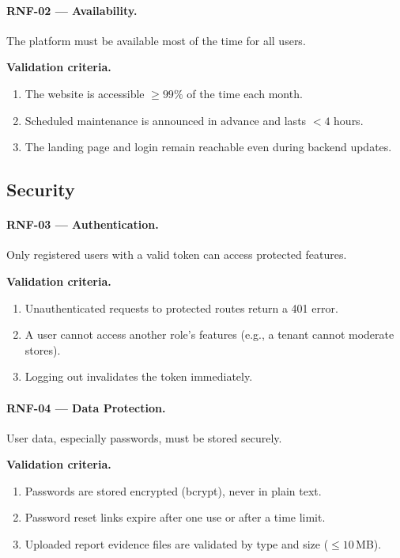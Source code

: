 \documentclass[11pt,a4paper,oneside]{report}
\begin{document}
\paragraph{RNF-02 --- Availability.} \label{req:RNF-02}
The platform must be available most of the time for all users.

\textbf{Validation criteria.}
\begin{enumerate}
\item The website is accessible $\geq 99\%$ of the time each month.
\item Scheduled maintenance is announced in advance and lasts $< 4$ hours.
\item The landing page and login remain reachable even during backend updates.
\end{enumerate}

\subsection{Security}
\label{nfr:security}

\paragraph{RNF-03 --- Authentication.} \label{req:RNF-03}
Only registered users with a valid token can access protected features.

\textbf{Validation criteria.}
\begin{enumerate}
\item Unauthenticated requests to protected routes return a 401 error.
\item A user cannot access another role's features (e.g., a tenant cannot moderate stores).
\item Logging out invalidates the token immediately.
\end{enumerate}

\paragraph{RNF-04 --- Data Protection.} \label{req:RNF-04}
User data, especially passwords, must be stored securely.

\textbf{Validation criteria.}
\begin{enumerate}
\item Passwords are stored encrypted (bcrypt), never in plain text.
\item Password reset links expire after one use or after a time limit.
\item Uploaded report evidence files are validated by type and size ($\leq 10$\,MB).
\end{enumerate}
\end{document}

